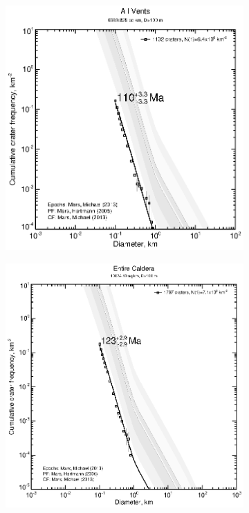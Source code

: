 \documentclass[12pt,letter]{article}
\begin{document}
\begin{figure}
\begin{subfigure}{.33\textwidth}
  \includegraphics[width=\linewidth,clip,trim=1cm 1cm 1.5cm 1cm]{figures/craterstats/arsia_all29_cum.eps}
\end{subfigure}
\begin{subfigure}{.33\textwidth}
  \includegraphics[width=\linewidth,clip,trim=1cm 1cm 1.5cm 1cm]{figures/craterstats/arsia_fullarea_100m_cum.eps}

\end{subfigure}
\end{figure}
\end{document}
